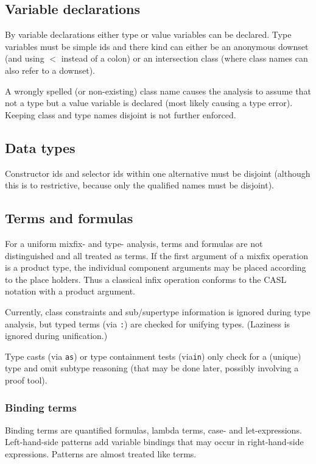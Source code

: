 \documentclass{article}
\begin{document}
\subsection{Variable declarations}

By variable declarations either type or value variables can be declared.
Type variables must be simple ids and there kind can either be an anonymous
downset (and using $<$ instead of a colon) or an intersection class (where
class names can also refer to a downset).

A wrongly spelled (or non-existing) class name causes the analysis to assume
that not a type but a value variable is declared (most likely causing a type
error). Keeping class and type names disjoint is not further enforced.

\subsection{Data types}

Constructor ids and selector ids within one alternative must be disjoint
(although this is to restrictive, because only the qualified names must be
disjoint).

\subsection{Terms and formulas}

For a uniform mixfix- and type- analysis, terms and formulas are not
distinguished and all treated as terms. If the first argument of a mixfix
operation is a product type, the individual component arguments may be placed
according to the place holders. Thus a classical infix operation conforms to
the CASL notation with a product argument. 

Currently, class constraints and sub/supertype information is ignored during
type analysis, but typed terms (via \texttt{:}) are checked for unifying
types. (Laziness is ignored during unification.)

Type casts (via \texttt{as}) or type containment tests (via\texttt{in})
only check for a (unique) type and omit subtype reasoning (that may be done
later, possibly involving a proof tool).

\subsubsection{Binding terms}

Binding terms are quantified formulas, lambda terms, case- and
let-expressions. Left-hand-side patterns add variable bindings that may
occur in right-hand-side expressions. Patterns are almost treated like terms.
\end{document}
